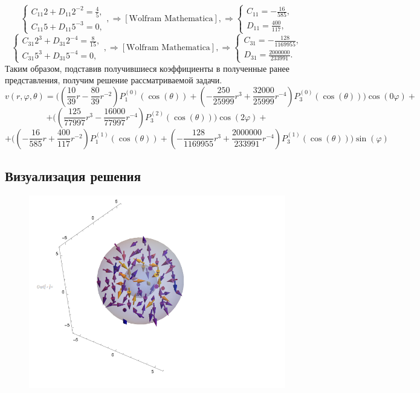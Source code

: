 \documentclass[11pt]{article}
\begin{document}
  $$\begin{cases}
     C_{11}2+D_{11}2^{-2}=\frac{4}{5},\\
     C_{11}5+D_{11}5^{-3}=0,
 \end{cases},\Rightarrow [\text{Wolfram Mathematica}], \Rightarrow
 \begin{cases}
     C_{11}=-\frac{16}{585},\\
     D_{11}=\frac{400}{117},
 \end{cases}$$
  $$\begin{cases}
     C_{31}2^3+D_{31}2^{-4}=\frac{8}{15},\\
     C_{31}5^3+D_{31}5^{-4}=0,
 \end{cases},\Rightarrow [\text{Wolfram Mathematica}], \Rightarrow
 \begin{cases}
     C_{31}=-\frac{128}{1169955},\\
     D_{31}=\frac{2000000}{233991}.
 \end{cases}$$
 Таким образом, подставив получившиеся коэффициенты в полученные ранее представления, получим решение рассматриваемой задачи.
 $$v(r,\varphi, \theta)=\Big((\frac{10}{39}r-\frac{80}{39}r^{-2})P_1^{(0)}(\cos(\theta))+(-\frac{250}{25999}r^3+\frac{32000}{25999}r^{-4})P_3^{(0)}(\cos(\theta))\Big)\cos(0\varphi)+$$$$+\Big((\frac{125}{77997}r^3-\frac{16000}{77997}r^{-4})P_3^{(2)}(\cos(\theta))\Big)\cos(2\varphi)+$$$$+\Big((-\frac{16}{585}r+\frac{400}{117}r^{-2})P_1^{(1)}(\cos(\theta))+(-\frac{128}{1169955}r^3+\frac{2000000}{233991}r^{-4})P_3^{(1)}(\cos(\theta))\Big)\sin(\varphi)$$
\subsection*{Визуализация решения}
\begin{figure}
    \centering
    \includegraphics[width=1\linewidth]{image2.png}
\end{figure}
\end{document}
